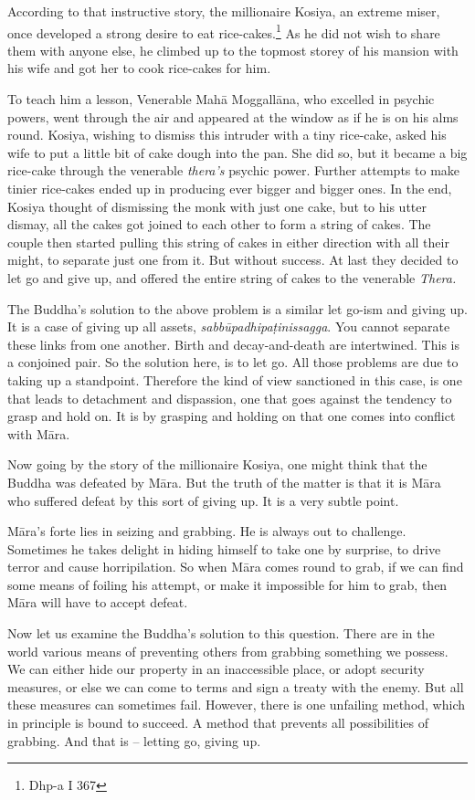 According to that instructive story, the millionaire Kosiya, an extreme miser, once developed a strong desire to eat rice-cakes.\footnote{Dhp-a I 367} As he did not wish to share them with anyone else, he climbed up to the topmost storey of his mansion with his wife and got her to cook rice-cakes for him.

To teach him a lesson, Venerable Mahā Moggallāna, who excelled in psychic powers, went through the air and appeared at the window as if he is on his alms round. Kosiya, wishing to dismiss this intruder with a tiny rice-cake, asked his wife to put a little bit of cake dough into the pan. She did so, but it became a big rice-cake through the venerable \emph{thera's} psychic power. Further attempts to make tinier rice-cakes ended up in producing ever bigger and bigger ones. In the end, Kosiya thought of dismissing the monk with just one cake, but to his utter dismay, all the cakes got joined to each other to form a string of cakes. The couple then started pulling this string of cakes in either direction with all their might, to separate just one from it. But without success. At last they decided to let go and give up, and offered the entire string of cakes to the venerable \emph{Thera.}

The Buddha's solution to the above problem is a similar let go-ism and giving up. It is a case of giving up all assets, \emph{sabbūpadhipaṭinissagga}. You cannot separate these links from one another. Birth and decay-and-death are intertwined. This is a conjoined pair. So the solution here, is to let go. All those problems are due to taking up a standpoint. Therefore the kind of view sanctioned in this case, is one that leads to detachment and dispassion, one that goes against the tendency to grasp and hold on. It is by grasping and holding on that one comes into conflict with Māra.

Now going by the story of the millionaire Kosiya, one might think that the Buddha was defeated by Māra. But the truth of the matter is that it is Māra who suffered defeat by this sort of giving up. It is a very subtle point.

Māra's forte lies in seizing and grabbing. He is always out to challenge. Sometimes he takes delight in hiding himself to take one by surprise, to drive terror and cause horripilation. So when Māra comes round to grab, if we can find some means of foiling his attempt, or make it impossible for him to grab, then Māra will have to accept defeat.

Now let us examine the Buddha's solution to this question. There are in the world various means of preventing others from grabbing something we possess. We can either hide our property in an inaccessible place, or adopt security measures, or else we can come to terms and sign a treaty with the enemy. But all these measures can sometimes fail. However, there is one unfailing method, which in principle is bound to succeed. A method that prevents all possibilities of grabbing. And that is -- letting go, giving up.

